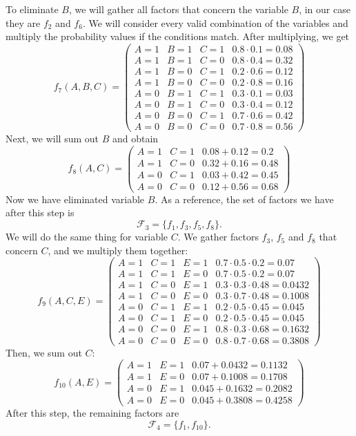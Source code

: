 \documentclass{article}
\theoremstyle{definition}
\begin{document}
To eliminate \(B\), we will gather all factors that concern the variable \(B\), in our case they are \(f_2\) and \(f_6\). We will consider every valid combination of the variables and multiply the probability values if the conditions match. After multiplying, we get
\[f_7(A, B, C) = \begin{pmatrix}
    A = 1 & B = 1 & C = 1 & 0.8\cdot 0.1 = 0.08 \\
    A = 1 & B = 1 & C = 0 & 0.8\cdot 0.4 = 0.32 \\
    A = 1 & B = 0 & C = 1 & 0.2\cdot 0.6 = 0.12 \\
    A = 1 & B = 0 & C = 0 & 0.2\cdot 0.8 = 0.16 \\
    A = 0 & B = 1 & C = 1 & 0.3\cdot 0.1 = 0.03 \\
    A = 0 & B = 1 & C = 0 & 0.3\cdot 0.4 = 0.12 \\
    A = 0 & B = 0 & C = 1 & 0.7\cdot 0.6 = 0.42 \\
    A = 0 & B = 0 & C = 0 & 0.7\cdot 0.8 = 0.56
\end{pmatrix}\]
Next, we will sum out \(B\) and obtain
\[f_8(A, C) = \begin{pmatrix}
    A = 1 & C = 1 & 0.08 + 0.12 = 0.2 \\
    A = 1 & C = 0 & 0.32 + 0.16 = 0.48 \\
    A = 0 & C = 1 & 0.03 + 0.42 = 0.45 \\
    A = 0 & C = 0 & 0.12 + 0.56 = 0.68
\end{pmatrix}\]
Now we have eliminated variable \(B\). As a reference, the set of factors we have after this step is
\[\mathcal{F}_3 = \{f_1, f_3, f_5, f_8\}.\]
We will do the same thing for variable \(C\). We gather factors \(f_3\), \(f_5\) and \(f_8\) that concern \(C\), and we multiply them together:
\[f_9(A, C, E) = \begin{pmatrix}
    A = 1 & C = 1 & E = 1 & 0.7\cdot 0.5 \cdot 0.2 = 0.07 \\
    A = 1 & C = 1 & E = 0 & 0.7\cdot 0.5 \cdot 0.2 = 0.07 \\
    A = 1 & C = 0 & E = 1 & 0.3\cdot 0.3 \cdot 0.48 = 0.0432 \\
    A = 1 & C = 0 & E = 0 & 0.3\cdot 0.7 \cdot 0.48 = 0.1008 \\
    A = 0 & C = 1 & E = 1 & 0.2\cdot 0.5 \cdot 0.45 = 0.045 \\
    A = 0 & C = 1 & E = 0 & 0.2\cdot 0.5 \cdot 0.45 = 0.045 \\
    A = 0 & C = 0 & E = 1 & 0.8\cdot 0.3 \cdot 0.68 = 0.1632 \\
    A = 0 & C = 0 & E = 0 & 0.8\cdot 0.7 \cdot 0.68 = 0.3808
\end{pmatrix}\]
Then, we sum out \(C\):
\[f_{10}(A, E) = \begin{pmatrix}
    A = 1 & E = 1 & 0.07 + 0.0432 = 0.1132 \\
    A = 1 & E = 0 & 0.07 + 0.1008 = 0.1708 \\
    A = 0 & E = 1 & 0.045 + 0.1632 = 0.2082 \\
    A = 0 & E = 0 & 0.045 + 0.3808 = 0.4258
\end{pmatrix}\]
After this step, the remaining factors are
\[\mathcal{F}_4 = \{f_1, f_{10}\}.\]
\end{document}
